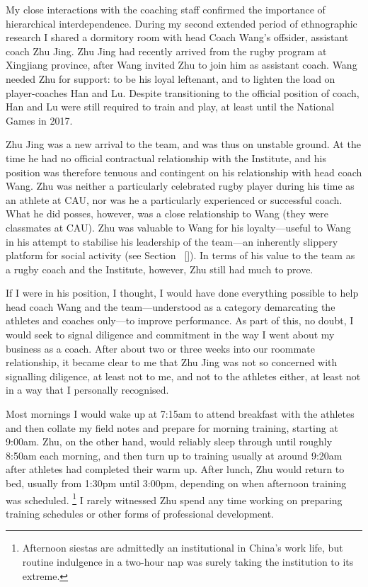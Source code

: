 \begin{CJK}{UTF8}{gbsn}
My close interactions with the coaching staff confirmed the importance of hierarchical interdependence.  During my second extended period of ethnographic research I shared a dormitory room with head Coach Wang's offsider, assistant coach Zhu Jing.  Zhu Jing had recently arrived from the rugby program at Xingjiang province, after Wang invited Zhu to join him as assistant coach.   Wang needed Zhu for support: to be his loyal leftenant, and to lighten the load on player-coaches Han and Lu. Despite transitioning to the official position of coach, Han and Lu were still required to train and play, at least until the National Games in 2017.

Zhu Jing was a new arrival to the team, and was thus on unstable ground. At the time he had no official contractual relationship with the Institute, and his position was therefore tenuous and contingent on his relationship with head coach Wang.  Zhu was neither a particularly celebrated rugby player during his time as an athlete at CAU, nor was he a particularly experienced or successful coach.  What he did posses, however, was a close relationship to Wang (they were classmates at CAU). Zhu was valuable to Wang for his loyalty---useful to Wang in his attempt to stabilise his leadership of the team---an inherently slippery platform for social activity (see Section ~\ref{}). In terms of his value to the team as a rugby coach and the Institute, however, Zhu still had much to prove.

If I were in his position, I thought, I would have done everything possible to help head coach Wang and the team—understood as  a category demarcating the athletes and coaches only---to improve performance.  As part of this, no doubt, I would seek to signal diligence and commitment in the way I went about my business as a coach.  After about two or three weeks into our roommate relationship, it became clear to me that Zhu Jing was not so concerned with signalling diligence, at least not to me, and not to the athletes either, at least not in a way that I personally recognised.

Most mornings I would wake up at 7:15am to attend breakfast with the athletes and then collate my field notes and prepare for morning training, starting at 9:00am.  Zhu, on the other hand, would reliably sleep through until roughly 8:50am each morning, and then turn up to training usually at around 9:20am after athletes had completed their warm up.  After lunch, Zhu would return to bed, usually from 1:30pm until 3:00pm, depending on when afternoon training was scheduled.  \footnote{Afternoon siestas are admittedly an institutional in China's work life, but routine indulgence in a two-hour nap was surely taking the institution to its extreme.}  I rarely witnessed Zhu spend any time working on preparing training schedules or other forms of professional development.


\end{CJK}
